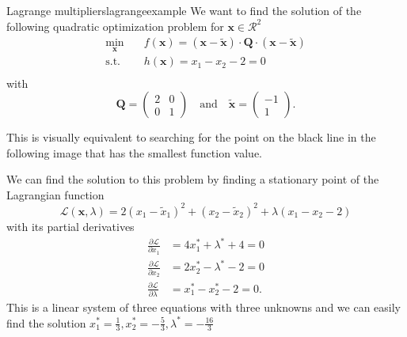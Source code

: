 \begin{example}{Lagrange multipliers}{lagrangeexample}
    We want to find the solution of the following quadratic optimization problem for $\mathbf{x} \in \mathcal{R}^2$
    \begin{equation}
        \begin{aligned}
            \min_{\mathbf{x}} \quad & f(\mathbf{x})= (\mathbf{x}-\tilde{\mathbf{x}}) \cdot \mathbf{Q} \cdot (\mathbf{x}-\tilde{\mathbf{x}})\\
            \textrm{s.t.} \quad     & h(\mathbf{x}) = x_1 - x_2 - 2 = 0  \\
        \end{aligned}
    \end{equation}
    with 
    \begin{equation}
        \mathbf{Q} = 
        \begin{pmatrix}
        2 & 0 \\
        0 & 1 
        \end{pmatrix} 
        \quad 
        \text{and}
        \quad
        \tilde{\mathbf{x}} = 
        \begin{pmatrix}
        -1\\
        1 
        \end{pmatrix}.
    \end{equation}

    This is visually equivalent to searching for the point on the black line in the following image that has the smallest function value.
    \begin{center}
        
    \end{center}

    We can find the solution to this problem by finding a stationary point of the Lagrangian function
    \begin{equation}
        \mathcal{\mathcal{L}}(\mathbf{x}, \lambda) = 2 (x_1-\tilde{x}_1)^2 + (x_2-\tilde{x}_2)^2 + \lambda (x_1 - x_2 -2)
    \end{equation}
    with its partial derivatives 
    \begin{align}
        \frac{\partial \mathcal{\mathcal{L}}}{\partial x_1} &= 4 x_1^* + \lambda^*  + 4 = 0\\
        \frac{\partial \mathcal{\mathcal{L}}}{\partial x_2} &= 2 x_2^* - \lambda^*  -2 = 0\\
        \frac{\partial \mathcal{\mathcal{L}}}{\partial \lambda} &= x_1^* - x_2^* -2 = 0.
    \end{align}
    This is a linear system of three equations with three unknowns and we can easily find the solution $x_1^*=\frac{1}{3} , x_2^*=-\frac{5}{3}, \lambda^*=-\frac{16}{3}$
\end{example}


